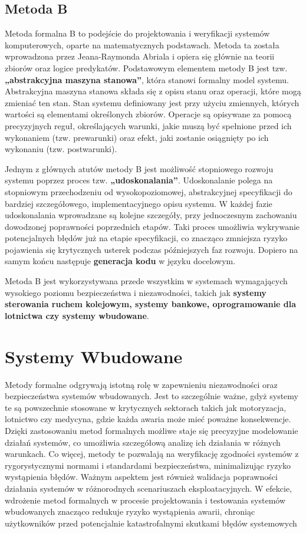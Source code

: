 \documentclass[conference]{IEEEtran}
\begin{document}
    \subsection{Metoda B}
    Metoda formalna B to podejście do projektowania i weryfikacji systemów komputerowych, oparte na matematycznych podstawach. Metoda ta została wprowadzona przez Jeana-Raymonda Abriala i opiera się głównie na teorii zbiorów oraz logice predykatów.
    Podstawowym elementem metody B jest tzw. \textbf{„abstrakcyjna maszyna stanowa”}, która stanowi formalny model systemu. Abstrakcyjna maszyna stanowa składa się z opisu stanu oraz operacji, które mogą zmieniać ten stan. Stan systemu definiowany jest przy użyciu zmiennych, których wartości są elementami określonych zbiorów. Operacje są opisywane za pomocą precyzyjnych reguł, określających warunki, jakie muszą być spełnione przed ich wykonaniem (tzw. prewarunki) oraz efekt, jaki zostanie osiągnięty po ich wykonaniu (tzw. postwarunki).

Jednym z głównych atutów metody B jest możliwość stopniowego rozwoju systemu poprzez proces tzw. \textbf{„udoskonalania”}. Udoskonalanie polega na stopniowym przechodzeniu od wysokopoziomowej, abstrakcyjnej specyfikacji do bardziej szczegółowego, implementacyjnego opisu systemu. W każdej fazie udoskonalania wprowadzane są kolejne szczegóły, przy jednoczesnym zachowaniu dowodzonej poprawności poprzednich etapów. Taki proces umożliwia wykrywanie potencjalnych błędów już na etapie specyfikacji, co znacząco zmniejsza ryzyko pojawienia się krytycznych usterek podczas późniejszych faz rozwoju.
Dopiero na samym końcu następuje \textbf{generacja kodu} w języku docelowym.

Metoda B jest wykorzystywana przede wszystkim w systemach wymagających wysokiego poziomu bezpieczeństwa i niezawodności, takich jak \textbf{systemy sterowania ruchem kolejowym, systemy bankowe, oprogramowanie dla lotnictwa czy systemy wbudowane}.
    
    \section{Systemy Wbudowane}
    
    Metody formalne odgrywają istotną rolę w zapewnieniu niezawodności oraz bezpieczeństwa systemów wbudowanych.
    Jest to szczególnie ważne, gdyż systemy te są powszechnie stosowane w krytycznych sektorach takich jak motoryzacja, lotnictwo czy medycyna,
    gdzie każda awaria może mieć poważne konsekwencje. Dzięki zastosowaniu metod formalnych możliwe staje się precyzyjne modelowanie działań  systemów,
    co umożliwia szczegółową analizę ich działania w różnych warunkach. Co więcej, metody te pozwalają na weryfikację zgodności systemów z rygorystycznymi normami i
    standardami bezpieczeństwa, minimalizując ryzyko wystąpienia błędów. Ważnym aspektem jest również walidacja poprawności działania systemów w różnorodnych scenariuszach eksploatacyjnych.
    W efekcie, wdrożenie metod formalnych w procesie projektowania i testowania systemów wbudowanych znacząco redukuje ryzyko wystąpienia awarii,
    chroniąc użytkowników przed potencjalnie katastrofalnymi skutkami błędów systemowych
\end{document}
